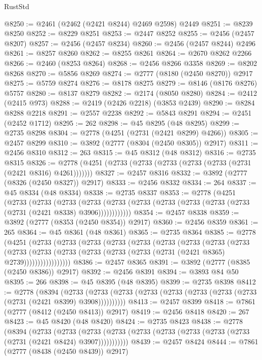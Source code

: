 \begin{lexlean}{RustStd}
\begin{coremodule}
@8250 := @2461 (@2462 (@2421 @8244) @2469 @2598) @2449
@8251 := @8239 @8250
@8252 := @8229 @8251
@8253 := @2447 @8252
@8255 := @2456 (@2457 @8207)
@8257 := @2456 (@2457 @8234)
@8260 := @2456 (@2457 @8244) @2496
@8261 := @8257 @8260
@8262 := @8255 @8261
@8264 := @2670 @8262 @2266
@8266 := @2460 (@8253 @8264)
@8268 := @2456 @8266 @3358
@8269 := @8202 @8268
@8270 := @5856 @8269
@8274 := @2777 (@8180 (@2450 @8270)) @2917
@8275 := @5759 @8274
@8276 := @8178 @8275
@8279 := @8146 (@8176 @8276) @5757
@8280 := @8137 @8279
@8282 := @2174 (@8050 @8280)
@8284 := @2412 (@2415 @973)
@8288 := @2419 (@2426 @2218) (@3853 @2439)
@8290 := @8284 @8288 @2218
@8291 := @2557 @2238
@8292 := @5843 @8291
@8294 := @2451 (@2452 @1712)
@8295 := 262
@8298 := @45 @8295 (@48 @8295)
@8299 := @2735 @8298
@8304 := @2778 (@4251 (@2731 (@2421 @8299) @4266))
@8305 := @2457 @8299
@8310 := @3892 (@2777 (@8304 (@2450 @8305)) @2917)
@8311 := @2456 @8310
@8312 := 263
@8315 := @45 @8312 (@48 @8312)
@8316 := @2735 @8315
@8326 := @2778 (@4251 (@2733 (@2733 (@2733 (@2733 (@2733 (@2731 (@2421 @8316) @4261)))))))
@8327 := @2457 @8316
@8332 := @3892 (@2777 (@8326 (@2450 @8327)) @2917)
@8333 := @2456 @8332
@8334 := 264
@8337 := @45 @8334 (@48 @8334)
@8338 := @2735 @8337
@8353 := @2778
    (@4251
      (@2733
        (@2733
          (@2733
            (@2733 (@2733 (@2733 (@2733 (@2733 (@2733 (@2733 (@2731 (@2421 @8338) @3906))))))))))))
@8354 := @2457 @8338
@8359 := @3892 (@2777 (@8353 (@2450 @8354)) @2917)
@8360 := @2456 @8359
@8361 := 265
@8364 := @45 @8361 (@48 @8361)
@8365 := @2735 @8364
@8385 := @2778
    (@4251
      (@2733
        (@2733
          (@2733
            (@2733
              (@2733
                (@2733
                  (@2733
                    (@2733
                      (@2733
                        (@2733
                          (@2733
                            (@2733 (@2733 (@2733 (@2733 (@2731 (@2421 @8365) @2739)))))))))))))))))
@8386 := @2457 @8365
@8391 := @3892 (@2777 (@8385 (@2450 @8386)) @2917)
@8392 := @2456 @8391
@8394 := @3893 @84 @50
@8395 := 266
@8398 := @45 @8395 (@48 @8395)
@8399 := @2735 @8398
@8412 := @2778
    (@8394
      (@2733 (@2733 (@2733 (@2733 (@2733 (@2733 (@2733 (@2733 (@2731 (@2421 @8399) @3908))))))))))
@8413 := @2457 @8399
@8418 := @7861 (@2777 (@8412 (@2450 @8413)) @2917)
@8419 := @2456 @8418
@8420 := 267
@8423 := @45 @8420 (@48 @8420)
@8424 := @2735 @8423
@8438 := @2778
    (@8394
      (@2733
        (@2733
          (@2733 (@2733 (@2733 (@2733 (@2733 (@2733 (@2733 (@2731 (@2421 @8424) @3907)))))))))))
@8439 := @2457 @8424
@8444 := @7861 (@2777 (@8438 (@2450 @8439)) @2917)

\end{coremodule}
\end{lexlean}
